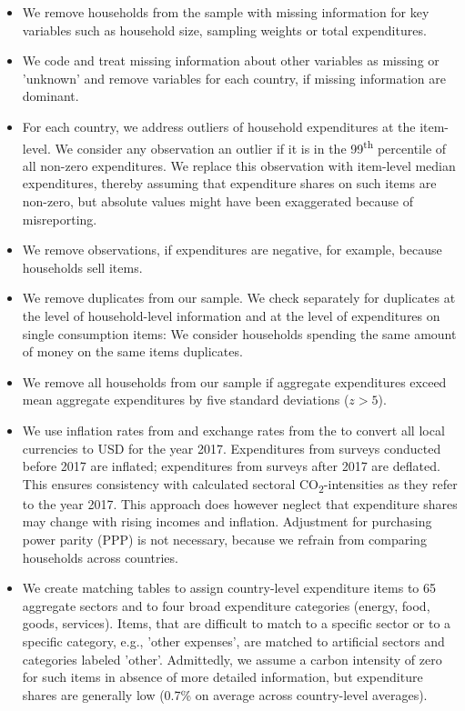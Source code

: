 \documentclass[12pt, a4paper]{article}
\begin{document}
\begin{refsection}
\begin{itemize}
    \item We remove households from the sample with missing information for key variables such as household size, sampling weights or total expenditures.
    \item We code and treat missing information about other variables as missing or 'unknown' and remove variables for each country, if missing information are dominant.
    \item For each country, we address outliers of household expenditures at the item-level. We consider any observation an outlier if it is in the 99\textsuperscript{th} percentile of all non-zero expenditures. We replace this observation with item-level median expenditures, thereby assuming that expenditure shares on such items are non-zero, but absolute values might have been exaggerated because of misreporting.
    \item We remove observations, if expenditures are negative, for example, because households sell items.
    \item We remove duplicates from our sample. We check separately for duplicates at the level of household-level information and at the level of expenditures on single consumption items: We consider households spending the same amount of money on the same items duplicates.
    \item We remove all households from our sample if aggregate expenditures exceed mean aggregate expenditures by five standard deviations ($z>5$).
    \item We use inflation rates from \textcite{IMF.2020} and exchange rates from the \textcite{WorldBankGroup.2023} to convert all local currencies to USD for the year 2017. Expenditures from surveys conducted before 2017 are inflated; expenditures from surveys after 2017 are deflated. This ensures consistency with calculated sectoral CO\textsubscript{2}-intensities as they refer to the year 2017. This approach does however neglect that expenditure shares may change with rising incomes and inflation. Adjustment for purchasing power parity (PPP) is not necessary, because we refrain from comparing households across countries.
    \item We create matching tables to assign country-level expenditure items to 65 aggregate sectors and to four broad expenditure categories (energy, food, goods, services). Items, that are difficult to match to a specific sector or to a specific category, e.g., 'other expenses', are matched to artificial sectors and categories labeled 'other'. Admittedly, we assume a carbon intensity of zero for such items in absence of more detailed information, but expenditure shares are generally low (0.7\% on average across country-level averages). 

\end{itemize}
\end{refsection}
\end{document}
